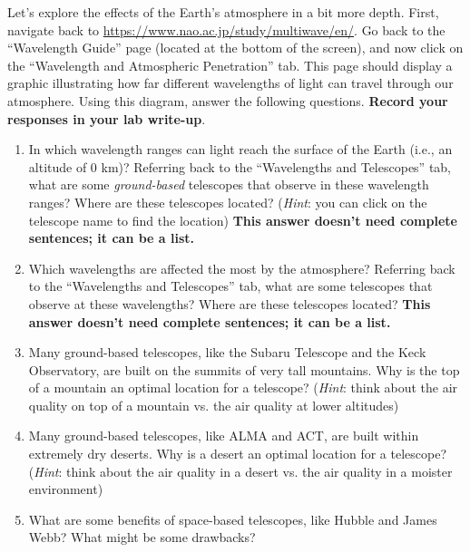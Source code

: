 \documentclass[11pt]{article}
\begin{document}
\medskip \noindent
Let's explore the effects of the Earth's atmosphere in a bit more depth. First, navigate back to \url{https://www.nao.ac.jp/study/multiwave/en/}. Go back to the ``Wavelength Guide'' page (located at the bottom of the screen), and now click on the ``Wavelength and Atmospheric Penetration'' tab. This page should display a graphic illustrating how far different wavelengths of light can travel through our atmosphere. Using this diagram, answer the following questions. \textbf{Record your responses in your lab write-up}.
\begin{enumerate}
    \item In which wavelength ranges can light reach the surface of the Earth (i.e., an altitude of 0 km)? Referring back to the ``Wavelengths and Telescopes'' tab, what are some \emph{ground-based} telescopes that observe in these wavelength ranges? Where are these telescopes located? (\textit{Hint}: you can click on the telescope name to find the location) \textbf{This answer doesn't need complete sentences; it can be a list.}
    
    \item Which wavelengths are affected the most by the atmosphere? Referring back to the ``Wavelengths and Telescopes'' tab, what are some telescopes that observe at these wavelengths? Where are these telescopes located? \textbf{This answer doesn't need complete sentences; it can be a list.}
    
    \item Many ground-based telescopes, like the Subaru Telescope and the Keck Observatory, are built on the summits of very tall mountains. Why is the top of a mountain an optimal location for a telescope? (\textit{Hint}: think about the air quality on top of a mountain vs. the air quality at lower altitudes)
    
    \item Many ground-based telescopes, like ALMA and ACT, are built within extremely dry deserts. Why is a desert an optimal location for a telescope? (\textit{Hint}: think about the air quality in a desert vs. the air quality in a moister environment)
    
    \item What are some benefits of space-based telescopes, like Hubble and James Webb? What might be some drawbacks?
\end{enumerate}

\newpage
\end{document}
